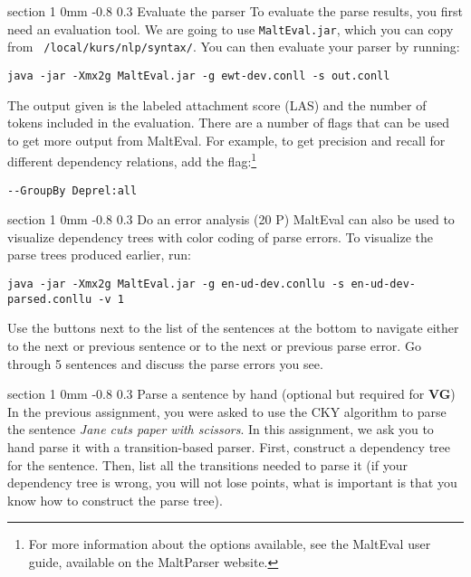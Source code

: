 \documentclass[10.9pt]{article}
\makeatletter
\newcommand{\newsec}[2]{\section{#1}\label{sec:#2}\noindent}
\renewcommand{\section}{\@startsection
{section}%
{1}%
{0mm}%
{-0.8\baselineskip}%
{0.3\baselineskip}%
{\bfseries\large}}%
\makeatother
\begin{document}
\newsec{Evaluate the parser}{eval}%
To evaluate the parse results, you first need an evaluation tool. We
are going to use {\tt MaltEval.jar}, which you can copy from {\tt
  /local/kurs/nlp/syntax/}. You can then evaluate your parser by
running:
\begin{small}
\begin{verbatim}
java -jar -Xmx2g MaltEval.jar -g ewt-dev.conll -s out.conll
\end{verbatim}
\end{small}
The output given is the labeled attachment score (LAS) and the number
of tokens included in the evaluation. There are a number of flags that
can be used to get more output from MaltEval. For example, to get
precision and recall for different dependency relations, add the
flag:\footnote{For more information about the options available, see
  the MaltEval user guide, available on the MaltParser website.}
\begin{small}
\begin{verbatim}
--GroupBy Deprel:all
\end{verbatim}
\end{small}

\newsec{Do an error analysis (20 P)}{err}%
MaltEval can also be used to visualize dependency trees with color
coding of parse errors. To visualize the parse trees produced earlier,
run:
\begin{small}
\begin{verbatim}
java -jar -Xmx2g MaltEval.jar -g en-ud-dev.conllu -s en-ud-dev-parsed.conllu -v 1
\end{verbatim}
\end{small}
Use the buttons next to the list of the sentences at the bottom to
navigate either to the next or previous sentence or to the next or
previous parse error.
Go through 5 sentences and discuss the parse errors you see.

\newsec{Parse a sentence by hand (optional but required for \textbf{VG})}{handparse}
In the previous assignment, you were asked to use the CKY algorithm to
parse the sentence \textit{Jane cuts paper with scissors}. In this
assignment, we ask you to hand parse it with a transition-based
parser. First, construct a dependency tree for the sentence. Then,
list all the transitions needed to parse it (if your dependency tree
is wrong, you will not lose points, what is important is that you know
how to construct the parse tree).
\end{document}
